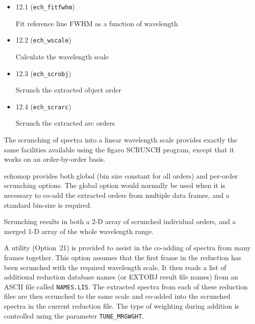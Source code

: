 \documentclass[11pt,twoside]{article}
\newcommand{\htmlref}[2]{#1}
\newcommand{\xref}[3]{#1}
\newcommand{\xlabel}[1]{}
\newcommand{\mlabel}[1]{\xlabel{#1}\label{#1}}
\newcommand{\myindex}[1]{\index{#1}}
\renewcommand{\myindex}[1]{}
\begin{document}
\begin{itemize}

\item \mlabel{ech_fitfwhm} {12.1} ({\tt{ech\_fitfwhm}})

      Fit reference line FWHM as a function of wavelength

\item \mlabel{ech_fit_wscale} {12.2} ({\tt{ech\_wscale}})

      Calculate the wavelength scale

\item \mlabel{ech_scrobj} {12.3} ({\tt{ech\_scrobj}})

      Scrunch the extracted object order

\item \mlabel{ech_scrarc} {12.4} ({\tt{ech\_scrarc}})

      Scrunch the extracted arc  orders

\end{itemize}

\myindex{FIGARO!SCRUNCH}
The scrunching of spectra into a linear wavelength scale provides exactly
the same facilities available using the \xref{{\sc figaro}}{sun86}{}
\xref{SCRUNCH}{sun86}{SCRUNCH} program, except that it works on an
order-by-order basis.

{\sc echomop} provides both global (bin size constant for all orders) and
per-order scrunching options. The global option would normally be used when
it is necessary to co-add the extracted orders from multiple data frames,
and a standard bin-size is required.

Scrunching results in both a 2-D array of scrunched individual orders, and a
merged 1-D array of the whole wavelength range.
\myindex{Multiple object frames}
\myindex{Merge multiple spectra}
\myindex{Weighting!during co-addition}
A utility (Option~21) is provided to assist in the co-adding of spectra
from many frames together. This option assumes that the first frame in the
reduction has been scrunched with the required wavelength scale. It then
reads a list of additional reduction database names (or EXTOBJ result
file names) from an ASCII file called {\tt NAMES.LIS}. The extracted
spectra from each of these reduction files are then scrunched to the same
scale and co-added into the scrunched spectra in the current reduction
file. The type of weighting during addition is controlled using the
parameter \htmlref{{\tt TUNE\_MRGWGHT}}{par_TUNE_MRGWGHT}\@.
\end{document}

